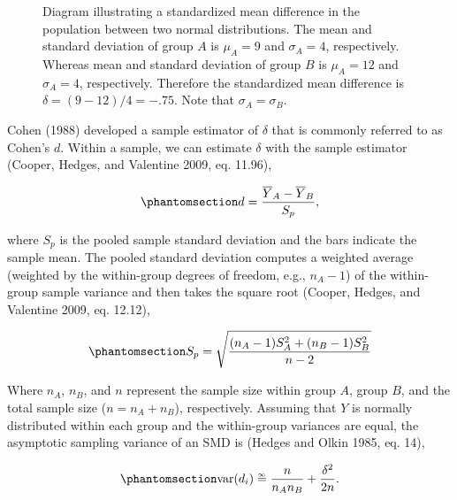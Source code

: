 \documentclass[
  letterpaper,
  DIV=11,
  numbers=noendperiod]{scrreprt}
\begin{document}
\begin{figure}[H]


\caption{\label{fig-d}Diagram illustrating a standardized mean
difference in the population between two normal distributions. The mean
and standard deviation of group \(A\) is \(\mu_A=9\) and \(\sigma_A=4\),
respectively. Whereas mean and standard deviation of group \(B\) is
\(\mu_A=12\) and \(\sigma_A=4\), respectively. Therefore the
standardized mean difference is \(\delta = (9-12)/4=-.75\). Note that
\(\sigma_A=\sigma_B\).}

\end{figure}%

Cohen (1988) developed a sample estimator of \(\delta\) that is commonly
referred to as Cohen's \(d\). Within a sample, we can estimate
\(\delta\) with the sample estimator (Cooper, Hedges, and Valentine
2009, eq. 11.96),

\begin{equation}\phantomsection\label{eq-d}{
d = \frac{\overline{Y}_A-\overline{Y}_B}{S_p},
}\end{equation}

where \(S_p\) is the pooled sample standard deviation and the bars
indicate the sample mean. The pooled standard deviation computes a
weighted average (weighted by the within-group degrees of freedom, e.g.,
\(n_{A}-1\)) of the within-group sample variance and then takes the
square root (Cooper, Hedges, and Valentine 2009, eq. 12.12),

\begin{equation}\phantomsection\label{eq-pooled-sd}{
S_p = \sqrt{\frac{(n_A-1)S_A^2 + (n_B-1)S_B^2}{n-2}}
}\end{equation}

Where \(n_A\), \(n_B\), and \(n\) represent the sample size within group
\(A\), group \(B\), and the total sample size (\(n = n_A+n_B\)),
respectively. Assuming that \(Y\) is normally distributed within each
group and the within-group variances are equal, the asymptotic sampling
variance of an SMD is (Hedges and Olkin 1985, eq. 14),

\begin{equation}\phantomsection\label{eq-var-d}{
\text{var}(d_i) \overset{_\infty}{=} \frac{n}{n_An_B} + \frac{\delta^2}{2n}.
}\end{equation}
\end{document}
